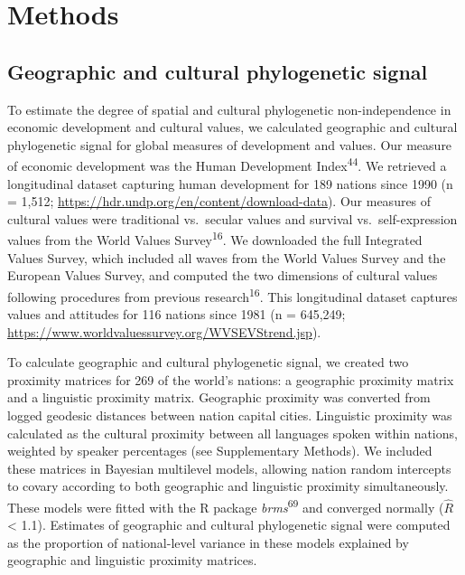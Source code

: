 \documentclass[english,man,floatsintext]{apa6}
\begin{document}
\hypertarget{methods}{%
\section{Methods}\label{methods}}

\hypertarget{geographic-and-cultural-phylogenetic-signal}{%
\subsection{Geographic and cultural phylogenetic signal}\label{geographic-and-cultural-phylogenetic-signal}}

To estimate the degree of spatial and cultural phylogenetic non-independence in economic development and cultural values, we calculated geographic and cultural phylogenetic signal for global measures of development and values. Our measure of economic development was the Human Development Index\textsuperscript{44}. We retrieved a longitudinal dataset capturing human development for 189 nations since 1990 (n = 1,512; \url{https://hdr.undp.org/en/content/download-data}). Our measures of cultural values were traditional vs.~secular values and survival vs.~self-expression values from the World Values Survey\textsuperscript{16}. We downloaded the full Integrated Values Survey, which included all waves from the World Values Survey and the European Values Survey, and computed the two dimensions of cultural values following procedures from previous research\textsuperscript{16}. This longitudinal dataset captures values and attitudes for 116 nations since 1981 (n = 645,249; \url{https://www.worldvaluessurvey.org/WVSEVStrend.jsp}).

To calculate geographic and cultural phylogenetic signal, we created two proximity matrices for 269 of the world's nations: a geographic proximity matrix and a linguistic proximity matrix. Geographic proximity was converted from logged geodesic distances between nation capital cities. Linguistic proximity was calculated as the cultural proximity between all languages spoken within nations, weighted by speaker percentages (see Supplementary Methods). We included these matrices in Bayesian multilevel models, allowing nation random intercepts to covary according to both geographic and linguistic proximity simultaneously. These models were fitted with the R package \emph{brms}\textsuperscript{69} and converged normally (\(\hat{R}\) \textless{} 1.1). Estimates of geographic and cultural phylogenetic signal were computed as the proportion of national-level variance in these models explained by geographic and linguistic proximity matrices.
\end{document}
